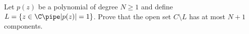 Let $p(z)$ be a polynomial of degree $N\geq 1$ and define $L=\{z\in \C
\pipe |p(z)|=1\}$. Prove that the open set $C\setminus L$ has at most
$N+1$ components.

